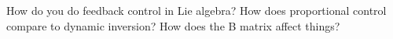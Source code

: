 \documentclass[../main.tex]{subfiles}
\begin{document}
How do you do feedback control in Lie algebra? How does proportional control compare to dynamic inversion? How does the B matrix affect things?
\end{document}
